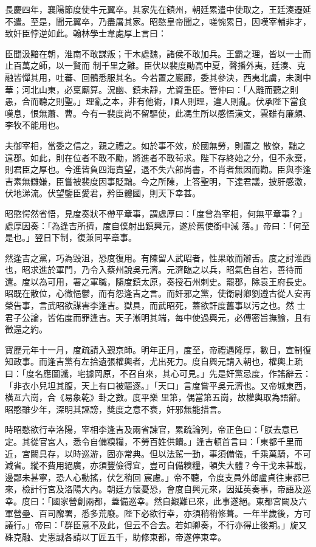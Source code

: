 \begin{pinyinscope}
 長慶四年，襄陽節度使牛元翼卒。其家先在鎮州，朝廷累遣中使取之，王廷湊遷延不遣。至是，聞元翼卒，乃盡屠其家。昭愍皇帝聞之，嗟惋累日，因嘆宰輔非才，致奸臣悖逆如此。翰林學士韋處厚上言曰：



 臣聞汲黯在朝，淮南不敢謀叛；干木處魏，諸侯不敢加兵。王霸之理，皆以一士而止百萬之師，以一賢而
 制千里之難。臣伏以裴度勛高中夏，聲播外夷，廷湊、克融皆憚其用，吐蕃、回鶻悉服其名。今若置之巖廊，委其參決，西夷北虜，未測中華；河北山東，必稟廟算。況幽、鎮未靜，尤資重臣。管仲曰：「人離而聽之則愚，合而聽之則聖。」理亂之本，非有他術，順人則理，違人則亂。伏承陛下當食嘆息，恨無蕭、曹。今有一裴度尚不留驅使，此馮生所以感悟漢文，雲雖有廉頗、李牧不能用也。



 夫御宰相，當委之信之，親之禮之。如於事不效，於國無勞，則置之
 散僚，黜之遠郡。如此，則在位者不敢不勵，將進者不敢茍求。陛下存終始之分，但不永棄，則君臣之厚也。今進皆負四海責望，退不失六部尚書，不肖者無因而勸。臣與李逢吉素無讎嫌，臣嘗被裴度因事貶黜。今之所陳，上答聖明，下達君議，披肝感激，伏地涕流。伏望鑒臣愛君，矜臣體國，則天下幸甚。



 昭愍愕然省悟，見度奏狀不帶平章事，謂處厚曰：「度曾為宰相，何無平章事？」處厚因奏：「為逢吉所擠，度自僕射出鎮興元，遂於舊使銜中減
 落。」帝曰：「何至是也。」翌日下制，復兼同平章事。



 然逢吉之黨，巧為毀沮，恐度復用。有陳留人武昭者，性果敢而辯舌。度之討淮西也，昭求進於軍門，乃令入蔡州說吳元濟。元濟臨之以兵，昭氣色自若，善待而還。度以為可用，署之軍職，隨度鎮太原，奏授石州刺史。罷郡，除袁王府長史。昭既在散位，心微悒鬱，而有怨逢吉之言。而奸邪之黨，使衛尉卿劉遵古從人安再榮告事，言武昭欲謀害李逢吉。獄具，而武昭死，蓋欲訐度舊事以污之也。然
 士君子公論，皆佑度而罪逢吉。天子漸明其端，每中使過興元，必傳密旨撫諭，且有徵還之約。



 寶歷元年十一月，度疏請入覲京師。明年正月，度至，帝禮遇隆厚，數日，宣制復知政事。而逢吉黨有左拾遺張權輿者，尤出死力。度自興元請入朝也，權輿上疏曰：「度名應圖讖，宅據岡原，不召自來，其心可見。」先是奸黨忌度，作謠辭云：「非衣小兒坦其腹，天上有口被驅逐。」「天口」言度嘗平吳元濟也。又帝城東西，橫亙六崗，合《易象乾》卦之數。度平樂
 里第，偶當第五崗，故權輿取為語辭。昭愍雖少年，深明其誣謗，獎度之意不衰，奸邪無能措言。



 時昭愍欲行幸洛陽，宰相李逢吉及兩省諫官，累疏論列，帝正色曰：「朕去意已定。其從官宮人，悉令自備糗糧，不勞百姓供饋。」逢吉頓首言曰：「東都千里而近，宮闕具存，以時巡游，固亦常典。但以法駕一動，事須備儀，千乘萬騎，不可減省。縱不費用絕廣，亦須豐儉得宜，豈可自備糗糧，頓失大體？今干戈未甚戢，邊鄙未甚寧，恐人心動搖，伏乞稍回
 宸慮。」帝不聽，令度支員外郎盧貞往東都已來，檢計行宮及洛陽大內。朝廷方懷憂恐，會度自興元來，因延英奏事，帝語及巡幸。度曰：「國家營創兩都，蓋備巡幸。然自艱難已來，此事遂絕。東都宮闕及六軍營壘、百司廨署，悉多荒廢。陛下必欲行幸，亦須稍稍修葺。一年半歲後，方可議行。」帝曰：「群臣意不及此，但云不合去。若如卿奏，不行亦得止後期。」旋又硃克融、史憲誠各請以丁匠五千，助修東都，帝遂停東幸。




\end{pinyinscope}
